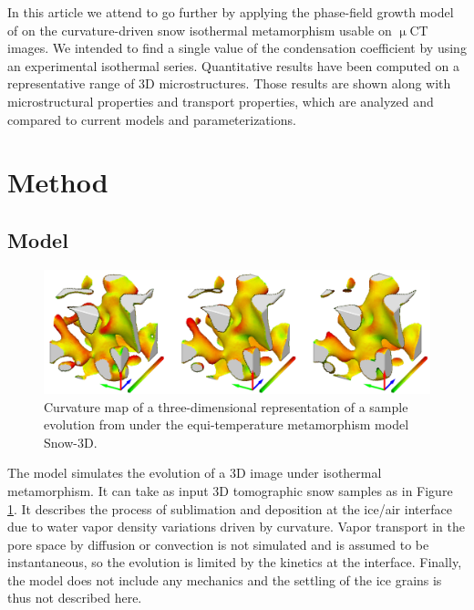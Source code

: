 \documentclass[draft,ms]{agujournal2019}
\begin{document}
In this article we attend to go further by applying the phase-field growth model of  on the curvature-driven snow isothermal metamorphism usable on $\upmu$CT images. We intended to find a single value of the condensation coefficient by using an experimental isothermal series. Quantitative results have been computed on a representative range of 3D microstructures. Those results are shown along with microstructural properties and transport properties, which are analyzed and compared to current models and parameterizations. 

\section{Method}
\label{sec:method}

\subsection{Model}
\label{subsec:model}
\begin{figure}
    \centering
    \includegraphics[width=\linewidth]{Figures/eboni_sous_volumes_simu.pdf}
    \caption{Curvature map of a three-dimensional representation of a sample evolution from \protect{} under the equi-temperature metamorphism model Snow-3D.}
    \label{fig:eboni_sous_volume}
\end{figure}

The model simulates the evolution of a 3D image under isothermal metamorphism. It can take as input 3D tomographic snow samples as in Figure \ref{fig:eboni_sous_volume}. It describes the process of sublimation and deposition at the ice/air interface due to water vapor density variations driven by curvature. Vapor transport in the pore space by diffusion or convection is not simulated and is assumed to be instantaneous, so the evolution is limited by the kinetics at the interface. Finally, the model does not include any mechanics and the settling of the ice grains is thus not described here.\\
\end{document}
